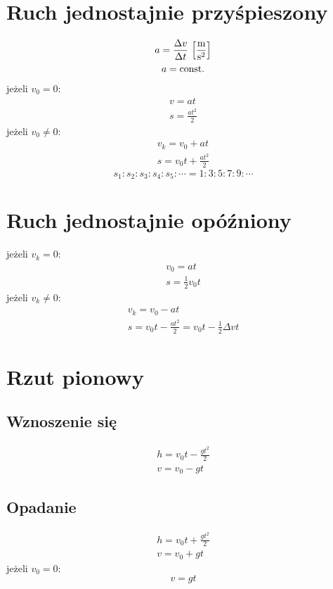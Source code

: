   \section{Ruch jednostajnie przyśpieszony}
    \begin{gather}
      a = \frac{\Delta v}{\Delta t} \,\left[\mathrm{\frac{m}{s^2}}\right]\\
      a = \operatorname{const.}
    \end{gather}
    jeżeli $v_0 = 0$:
    \begin{gather}
      v = at\\
      s = \frac{at^2}{2}
    \end{gather}
    jeżeli $v_0 \ne 0$:
    \begin{gather}
      v_k = v_0 + at\\
      s = v_0t + \frac{at^2}{2}
    \end{gather}
    \begin{equation}
      s_1:s_2:s_3:s_4:s_5:\cdots = 1:3:5:7:9:\cdots
    \end{equation}
  \section{Ruch jednostajnie opóźniony}
    jeżeli $v_k = 0$:
    \begin{gather}
      v_0 = at\\
      s = \frac{1}{2}v_0t
    \end{gather}
    jeżeli $v_k \ne 0$:
    \begin{gather}
      v_k = v_0 - at\\
      s = v_0t - \frac{at^2}{2} = v_0t - \frac{1}{2}\Delta vt
    \end{gather}
  \section{Rzut pionowy}
    \subsection{Wznoszenie się}
      \begin{gather}
        h = v_0t - \frac{gt^2}{2}\\
        v = v_0 - gt
      \end{gather}
    \subsection{Opadanie}
      \begin{gather}
        h = v_0t + \frac{gt^2}{2}\\
        v = v_0 + gt
      \end{gather}
      jeżeli $v_0 = 0$:
      \begin{equation}
        v = gt
      \end{equation}
